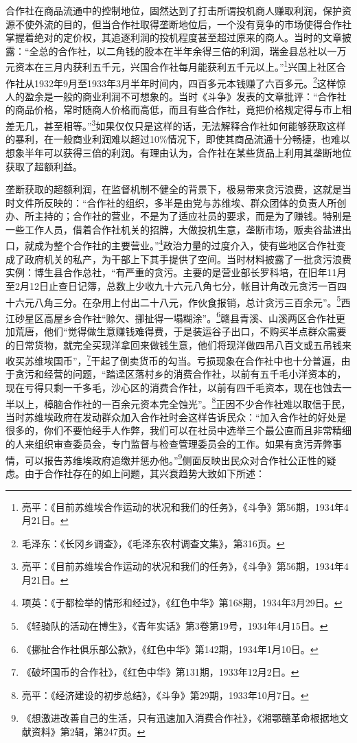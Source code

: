 合作社在商品流通中的控制地位，固然达到了打击所谓投机商人赚取利润，保护资源不使外流的目的，但当合作社取得垄断地位后，一个没有竞争的市场使得合作社掌握着绝对的定价权，其追逐利润的投机程度甚至超过原来的商人。当时的文章披露：“全总的合作社，以二角钱的股本在半年余得三倍的利润，瑞金县总社以一万元资本在三月内获利五千元，兴国合作社每月能获利五千元以上。”\footnote{亮平：《目前苏维埃合作运动的状况和我们的任务》，《斗争》第56期，1934年4月21日。}兴国上社区合作社从1932年9月至1933年3月半年时间内，四百多元本钱赚了六百多元。\footnote{毛泽东：《长冈乡调查》，《毛泽东农村调查文集》，第316页。}这样惊人的盈余是一般的商业利润不可想象的。当时《斗争》发表的文章批评：“合作社的商品价格，常时随商人价格而高低，而且有些合作社，竟把价格规定得与市上相差无几，甚至相等。”\footnote{亮平：《目前苏维埃合作运动的状况和我们的任务》，《斗争》第56期，1934年4月21日。}如果仅仅只是这样的话，无法解释合作社如何能够获取这样的暴利，在一般商业利润难以超过10\%情况下，即使其商品流通十分畅捷，也难以想象半年可以获得三倍的利润。有理由认为，合作社在某些货品上利用其垄断地位获取了超额利益。


垄断获取的超额利润，在监督机制不健全的背景下，极易带来贪污浪费，这就是当时文件所反映的：“合作社的组织，多半是由党与苏维埃、群众团体的负责人所创办、所主持的；合作社的营业，不是为了适应社员的要求，而是为了赚钱。特别是一些工作人员，借着合作社机关的招牌，大做投机生意，垄断市场，贩卖谷盐进出口，就成为整个合作社的主要营业。”\footnote{项英：《于都检举的情形和经过》，《红色中华》第168期，1934年3月29日。}政治力量的过度介入，使有些地区合作社变成了政府机关的私产，为干部上下其手提供了空间。当时材料披露了一批贪污浪费实例：博生县合作总社，“有严重的贪污。主要的是营业部长罗科培，在旧年11月至2月12日止查日记簿，总数上少收九十六元八角七分，帐目计角改元贪污一百四十六元八角三分。在杂用上付出二十八元，作伙食报销，总计贪污三百余元”。\footnote{《轻骑队的活动在博生》，《青年实话》第3卷第19号，1934年4月15日。}西江砂星区高屋乡合作社“赊欠、挪扯得一塌糊涂”。\footnote{《挪扯合作社俱乐部公款》，《红色中华》第142期，1934年1月10日。}赣县青溪、山溪两区合作社更加荒唐，他们“觉得做生意赚钱难得费，于是装运谷子出口，不购买半点群众需要的日常货物，就完全买现洋拿回来做钱生意，他们将现洋做四吊八百文或五吊钱来收买苏维埃国币”，\footnote{《破坏国币的合作社》，《红色中华》第131期，1933年12月2日。}干起了倒卖货币的勾当。亏损现象在合作社中也十分普遍，由于贪污和经营的问题，“踏迳区落村乡的消费合作社，以前有五千毛小洋资本的，现在亏得只剩一千多毛，沙心区的消费合作社，以前有四千毛资本，现在也蚀去一半以上，樟脑合作社的一百余元资本完全蚀光”。\footnote{亮平：《经济建设的初步总结》，《斗争》第29期，1933年10月7日。}正因不少合作社难以取信于民，当时苏维埃政府在发动群众加入合作社时会这样告诉民众：“加入合作社的好处是很多的，你们不要怕经手人作弊，我们可以在社员中选举三个最公直而且非常精细的人来组织审查委员会，专门监督与检查管理委员会的工作。如果有贪污弄弊事情，可以报告苏维埃政府追缴并惩办他。”\footnote{《想激进改善自己的生活，只有迅速加入消费合作社》，《湘鄂赣革命根据地文献资料》第2辑，第247页。}侧面反映出民众对合作社公正性的疑虑。由于合作社存在的如上问题，其兴衰趋势大致如下所述：

